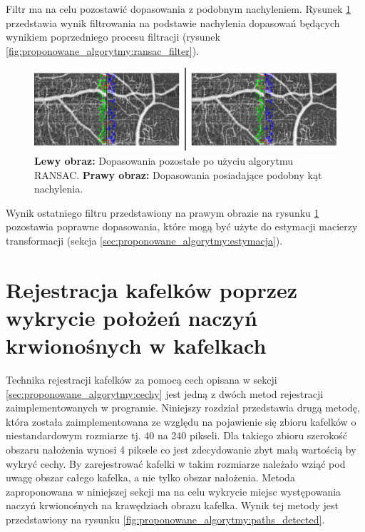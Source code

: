 Filtr ma na celu pozostawić dopasowania z podobnym nachyleniem. Rysunek \ref{fig:proponowane_algorytmy:slope} przedstawia wynik filtrowania na podstawie nachylenia dopasowań będących wynikiem poprzedniego procesu filtracji (rysunek \ref{fig:proponowane_algorytmy:ransac_filter}).

\begin{figure}[H]
  \centering
  \includegraphics[width=\textwidth]{gfx/slope}
  \caption{\textbf{Lewy obraz:} Dopasowania pozostałe po użyciu algorytmu RANSAC. \textbf{Prawy obraz:} Dopasowania posiadające podobny kąt nachylenia.}
  \label{fig:proponowane_algorytmy:slope}
\end{figure}

Wynik ostatniego filtru przedstawiony na prawym obrazie na rysunku \ref{fig:proponowane_algorytmy:slope} pozostawia poprawne dopasowania, które mogą być użyte do estymacji macierzy transformacji (sekcja \ref{sec:proponowane_algorytmy:estymacja}).

\section{Rejestracja kafelków poprzez wykrycie położeń naczyń krwionośnych w kafelkach}
\label{sec:proponowane_algorytmy:depth_first_search}

Technika rejestracji kafelków za pomocą cech opisana w sekcji \ref{sec:proponowane_algorytmy:cechy} jest jedną z dwóch metod rejestracji zaimplementowanych w programie. Niniejszy rozdział przedstawia drugą metodę, która została zaimplementowana ze względu na pojawienie się zbioru kafelków o niestandardowym rozmiarze tj. 40 na 240 pikseli. Dla takiego zbioru szerokość obszaru nałożenia wynosi 4 piksele co jest zdecydowanie zbyt małą wartością by wykryć cechy. By zarejestrować kafelki w takim rozmiarze należało wziąć pod uwagę obszar całego kafelka, a nie tylko obszar nałożenia. Metoda zaproponowana w niniejszej sekcji ma na celu wykrycie miejsc występowania naczyń krwionośnych na krawędziach obrazu kafelka. Wynik tej metody jest przedstawiony na rysunku \ref{fig:proponowane_algorytmy:paths_detected}.

